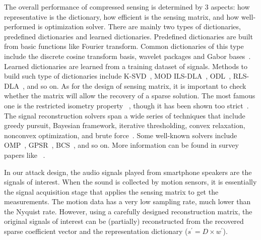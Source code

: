 The overall performance of compressed sensing is determined by 3 aspects: how representative is the dictionary, how efficient is the sensing matrix, and how well-performed is optimization solver.
%
There are mainly two types of dictionaries, predefined dictionaries and learned dictionaries. Predefined dictionaries are built from basic functions like Fourier transform. Common dictionaries of this type include the discrete cosine transform basis, wavelet packages and Gabor bases~\cite{skretting2017sparse}. Learned dictionaries are learned from a training dataset of signals. Methods to build such type of dictionaries include K-SVD~\cite{aharon2006k}, MOD ILS-DLA~\cite{engan2007family}, ODL~\cite{mairal2009online}, RLS-DLA~\cite{skretting2010recursive}, and so on.
%
As for the design of sensing matrix, it is important to check whether the matrix will allow the recovery of a sparse solution. The most famous one is the restricted isometry property ~\cite{candes2008restricted}, though it has been shown too strict~\cite{donoho2009observed}.
%
The signal reconstruction solvers span a wide series of techniques that include 
greedy pursuit, Bayesian framework, iterative thresholding, convex relaxation, nonconvex optimization, and brute force~\cite{tropp2010computational}. Some well-known solvers include
OMP~\cite{tropp2007signal}, GPSR~\cite{figueiredo2007gradient}, BCS~\cite{ji2008bayesian}, and so on. 
%
More information can be found in survey papers like ~\cite{zhang2015survey,skretting2017sparse,rani2018systematic}.




In our attack design, the audio signals played from smartphone speakers are the signals of interest. When the sound is collected by motion sensors, it is essentially the signal acquisition stage that applies the sensing matrix to get the measurements. The motion data has a very low sampling rate, much lower than the Nyquist rate. However, using a carefully designed reconstruction matrix, the original signals of interest can be (partially) reconstructed from the recovered sparse coefficient vector and the representation dictionary ($s^\prime = D \times w^\prime$).
%


